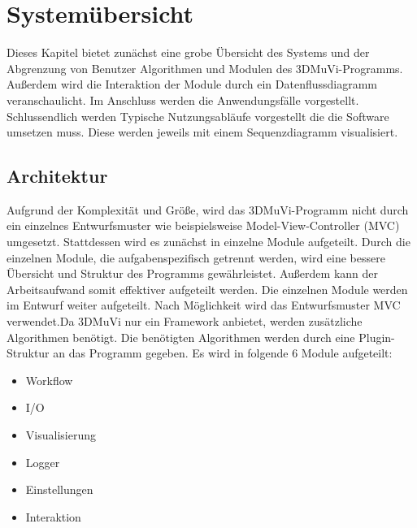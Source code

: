 \section{Systemübersicht}

Dieses Kapitel bietet zunächst eine grobe Übersicht des Systems und der Abgrenzung von Benutzer Algorithmen und Modulen des 3DMuVi-Programms. Außerdem wird die Interaktion der Module durch ein Datenflussdiagramm veranschaulicht. Im Anschluss werden die Anwendungsfälle vorgestellt. Schlussendlich werden Typische Nutzungsabläufe vorgestellt die die Software umsetzen muss. Diese werden jeweils mit einem  Sequenzdiagramm visualisiert.
\subsection{Architektur}

Aufgrund der Komplexität und Größe, wird das 3DMuVi-Programm nicht durch ein einzelnes Entwurfsmuster wie beispielsweise Model-View-Controller (MVC) umgesetzt. Stattdessen wird es zunächst in einzelne Module aufgeteilt.
Durch die einzelnen Module, die aufgabenspezifisch getrennt werden, wird eine bessere Übersicht und Struktur des Programms gewährleistet. Außerdem kann der Arbeitsaufwand somit effektiver aufgeteilt werden.\newline
Die einzelnen Module werden im Entwurf weiter aufgeteilt. Nach Möglichkeit wird das Entwurfsmuster MVC verwendet.\newline Da 3DMuVi nur ein Framework anbietet, werden zusätzliche Algorithmen benötigt.
Die benötigten Algorithmen werden durch eine Plugin-Struktur an das Programm gegeben.\newline \newline
Es wird in folgende 6 Module aufgeteilt:
\begin{itemize}
\item Workflow
\item I/O
\item Visualisierung
\item Logger
\item Einstellungen
\item Interaktion
\end{itemize}

